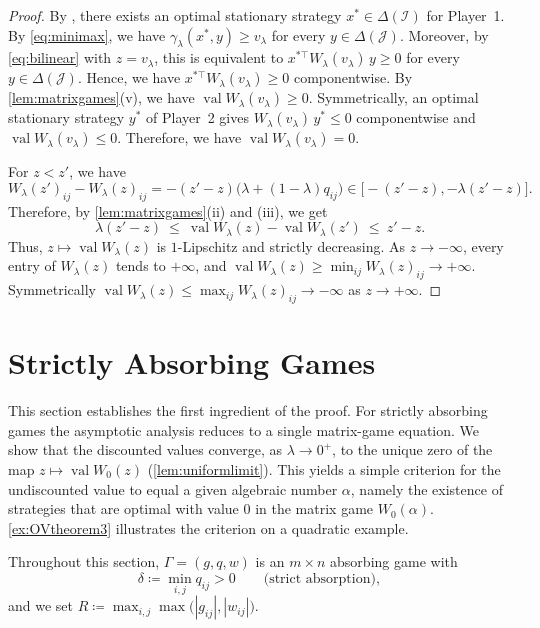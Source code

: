 \documentclass[11pt, a4paper]{article}
\theoremstyle{plain}
\theoremstyle{definition}
\DeclareMathOperator{\val}{val}
\newcommand{\defas}{\coloneqq}
\newcommand{\I}{\mathcal{I}}
\newcommand{\J}{\mathcal{J}}
\begin{document}
\begin{proof}
By \citet[Theorem~2]{Sha53}, there exists an optimal stationary strategy $x^* \in \Delta(\I)$ for Player~1.
By \cref{eq:minimax}, we have $\gamma_\lambda(x^*,y)\geq v_\lambda$ for every $y\in\Delta(\J)$.
Moreover, by \cref{eq:bilinear} with $z=v_\lambda$, this is equivalent to $x^{*\top}W_\lambda(v_\lambda)\,y\geq0$ for every $y\in\Delta(\J)$.
Hence, we have $x^{*\top}W_\lambda(v_\lambda)\geq0$ componentwise. 
By \cref{lem:matrixgames}(v), we have $\val W_\lambda(v_\lambda)\geq0$. Symmetrically, an optimal stationary strategy $y^*$ of Player~2 gives $W_\lambda(v_\lambda)\,y^*\leq0$ componentwise and $\val W_\lambda(v_\lambda)\leq0$. 
Therefore, we have $\val W_\lambda(v_\lambda)=0$.

For $z<z'$, we have
\[
    W_\lambda(z')_{ij}-W_\lambda(z)_{ij}=-(z'-z)\bigl(\lambda+(1-\lambda)q_{ij}\bigr)\in\bigl[-(z'-z),-\lambda(z'-z)\bigr] .
\]
Therefore, by \cref{lem:matrixgames}(ii) and (iii), we get
\begin{equation}\label{eq:strictmono}
\lambda(z'-z)\ \leq\ \val W_\lambda(z)-\val W_\lambda(z')\ \leq\ z'-z .
\end{equation}
Thus, $z\mapsto\val W_\lambda(z)$ is $1$-Lipschitz and strictly decreasing. As $z\to-\infty$, every entry of $W_\lambda(z)$ tends to $+\infty$, and $\val W_\lambda(z)\geq\min_{ij}W_\lambda(z)_{ij}\to+\infty$. Symmetrically $\val W_\lambda(z)\leq\max_{ij}W_\lambda(z)_{ij}\to-\infty$ as $z\to+\infty$.
\end{proof}

\section{Strictly Absorbing Games}\label{sec:uniform}

This section establishes the first ingredient of the proof.
For strictly absorbing games the asymptotic analysis reduces to a single matrix-game equation.
We show that the discounted values converge, as $\lambda\to0^+$, to the unique zero of the map $z\mapsto\val W_0(z)$ (\cref{lem:uniformlimit}).
This yields a simple criterion for the undiscounted value to equal a given algebraic number $\alpha$, namely the existence of strategies that are optimal with value $0$ in the matrix game $W_0(\alpha)$.
\cref{ex:OVtheorem3} illustrates the criterion on a quadratic example.

Throughout this section, $\Gamma=(g,q,w)$ is an $m\times n$ absorbing game with
\[
\delta\defas \min_{i,j}q_{ij}>0
\qquad\text{(strict absorption)},
\]
and we set $R\defas \max_{i,j}\max\bigl(|g_{ij}|,|w_{ij}|\bigr)$.
\end{document}
